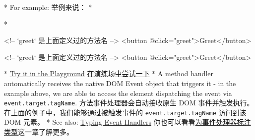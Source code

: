\begin{paracol}{2}
\switchcolumn[0]*%
For example:
\switchcolumn
举例来说：
\switchcolumn[0]*%
\switchcolumn
{}
\switchcolumn[0]*%
\begin{codeHtml}
<!-- `greet` 是上面定义过的方法名 -->
<button @click="greet">Greet</button>
\end{codeHtml}
\switchcolumn
\begin{codeHtml}
<!-- `greet` 是上面定义过的方法名 -->
<button @click="greet">Greet</button>
\end{codeHtml}
\switchcolumn[0]*%
\href{https://play.vuejs.org/\#eNpVj0FLxDAQhf/KMwjtXtq7dBcFQS/qzVMOrWFao2kSkkkvpf/dJIuCEBgm771vZnbx4H23JRJ3YogqaM+IxMlfpNWrd4GxI9CMA3NwK5psbaSVVjkbGXZaCediaJv3RN1XbE5FnZNVrJ3FEoi4pY0sn7BLC0yGArfjMxnjcLsXQrdNJtFxM+Ys0PcYa2CEjuBPylNYb4THtxdUobj0jH/YX3D963gKC5WyvGZ+xR7S5jf01yPzeblhWr2ZmErHw0dizivfK6PV91mKursUl6dSh/4qZ+vQ/+XE8QODonDi}{Try
it in the Playground}
\switchcolumn
\href{https://play.vuejs.org/\#eNpVj0FLxDAQhf/KMwjtXtq7dBcFQS/qzVMOrWFao2kSkkkvpf/dJIuCEBgm771vZnbx4H23JRJ3YogqaM+IxMlfpNWrd4GxI9CMA3NwK5psbaSVVjkbGXZaCediaJv3RN1XbE5FnZNVrJ3FEoi4pY0sn7BLC0yGArfjMxnjcLsXQrdNJtFxM+Ys0PcYa2CEjuBPylNYb4THtxdUobj0jH/YX3D963gKC5WyvGZ+xR7S5jf01yPzeblhWr2ZmErHw0dizivfK6PV91mKursUl6dSh/4qZ+vQ/+XE8QODonDi}{在演练场中尝试一下}
\switchcolumn[0]*%
A method handler automatically receives the native DOM Event object that
triggers it - in the example above, we are able to access the element
dispatching the event via \texttt{event.target.tagName}.
\switchcolumn
方法事件处理器会自动接收原生 DOM
事件并触发执行。在上面的例子中，我们能够通过被触发事件的
\texttt{event.target.tagName} 访问到该 DOM 元素。
\switchcolumn[0]*%
See also:
\href{https://vuejs.org/guide/typescript/composition-api.html\#typing-event-handlers}{Typing
Event Handlers}
\switchcolumn
你也可以看看\href{https://cn.vuejs.org/guide/typescript/composition-api.html\#typing-event-handlers}{为事件处理器标注类型}这一章了解更多。
\end{paracol}

